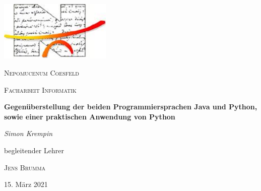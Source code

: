 \begin{titlepage}
	\centering
	\includegraphics[width=0.4\textwidth]{images/logo.png}\par\vspace{1cm}
	{\scshape\LARGE Nepomucenum Coesfeld \par}
	\vspace{1cm}
	{\scshape\Large Facharbeit Informatik\par}
	\vspace{1.5cm}
	{\huge\bfseries Gegenüberstellung der beiden Programmiersprachen Java und Python, sowie einer praktischen Anwendung von Python\par}
	\vspace{2cm}
	{\Large\itshape Simon Krempin\par}
	\vfill
	begleitender Lehrer\par
	\textsc{Jens Brumma}

	\vfill

	{\large 15. März 2021\par}
\end{titlepage}
\clearpage
\tableofcontents
\clearpage

